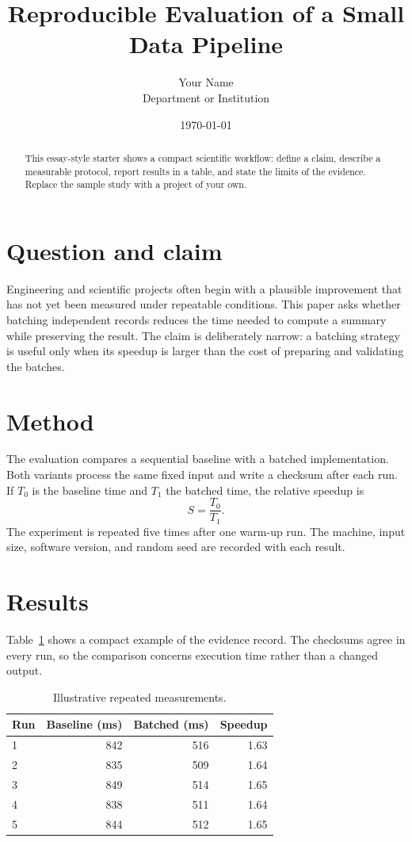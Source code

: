\documentclass[11pt,a4paper]{article}
\title{Reproducible Evaluation of a Small Data Pipeline}
\author{Your Name\\Department or Institution}
\date{\today}
\begin{document}
\maketitle

\begin{abstract}
This essay-style starter shows a compact scientific workflow: define a claim,
describe a measurable protocol, report results in a table, and state the
limits of the evidence. Replace the sample study with a project of your own.
\end{abstract}

\section{Question and claim}
Engineering and scientific projects often begin with a plausible improvement
that has not yet been measured under repeatable conditions. This paper asks
whether batching independent records reduces the time needed to compute a
summary while preserving the result. The claim is deliberately narrow: a
batching strategy is useful only when its speedup is larger than the cost of
preparing and validating the batches.

\section{Method}
The evaluation compares a sequential baseline with a batched implementation.
Both variants process the same fixed input and write a checksum after each
run. If $T_0$ is the baseline time and $T_1$ the batched time, the relative
speedup is
\begin{equation}
  S=\frac{T_0}{T_1}.
\end{equation}
The experiment is repeated five times after one warm-up run. The machine,
input size, software version, and random seed are recorded with each result.

\section{Results}
Table~\ref{tab:results} shows a compact example of the evidence record. The
checksums agree in every run, so the comparison concerns execution time rather
than a changed output.

\begin{table}[ht]
  \centering
  \caption{Illustrative repeated measurements.}
  \label{tab:results}
  \begin{tabular}{lrrr}
    \toprule
    Run & Baseline (ms) & Batched (ms) & Speedup \\
    \midrule
    1 & 842 & 516 & 1.63 \\
    2 & 835 & 509 & 1.64 \\
    3 & 849 & 514 & 1.65 \\
    4 & 838 & 511 & 1.64 \\
    5 & 844 & 512 & 1.65 \\
    \bottomrule
  \end{tabular}
\end{table}
\end{document}
